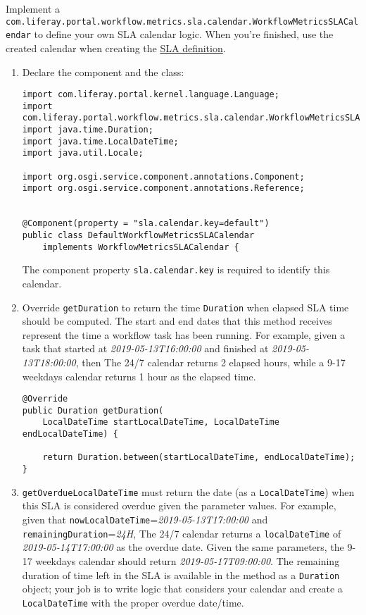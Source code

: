 Implement a
\texttt{com.liferay.portal.workflow.metrics.sla.calendar.WorkflowMetricsSLACalendar}
to define your own SLA calendar logic. When you're finished, use the
created calendar when creating the
\href{/docs/7-2/customization/-/knowledge_base/c/creating-sla-calendars}{SLA
definition}.

\begin{enumerate}
\def\labelenumi{\arabic{enumi}.}
\item
  Declare the component and the class:

\begin{verbatim}
import com.liferay.portal.kernel.language.Language;
import com.liferay.portal.workflow.metrics.sla.calendar.WorkflowMetricsSLACalendar;
import java.time.Duration;
import java.time.LocalDateTime;
import java.util.Locale;

import org.osgi.service.component.annotations.Component;
import org.osgi.service.component.annotations.Reference;


@Component(property = "sla.calendar.key=default")
public class DefaultWorkflowMetricsSLACalendar
    implements WorkflowMetricsSLACalendar {
\end{verbatim}

  The component property \texttt{sla.calendar.key} is required to
  identify this calendar.
\item
  Override \texttt{getDuration} to return the time \texttt{Duration}
  when elapsed SLA time should be computed. The start and end dates that
  this method receives represent the time a workflow task has been
  running. For example, given a task that started at
  \emph{2019-05-13T16:00:00} and finished at \emph{2019-05-13T18:00:00},
  then The 24/7 calendar returns 2 elapsed hours, while a 9-17 weekdays
  calendar returns 1 hour as the elapsed time.

\begin{verbatim}
@Override
public Duration getDuration(
    LocalDateTime startLocalDateTime, LocalDateTime endLocalDateTime) {

    return Duration.between(startLocalDateTime, endLocalDateTime);
}
\end{verbatim}
\item
  \texttt{getOverdueLocalDateTime} must return the date (as a
  \texttt{LocalDateTime}) when this SLA is considered overdue given the
  parameter values. For example, given that
  \texttt{nowLocalDateTime}=\emph{2019-05-13T17:00:00} and
  \texttt{remainingDuration}=\emph{24H}, The 24/7 calendar returns a
  \texttt{localDateTime} of \emph{2019-05-14T17:00:00} as the overdue
  date. Given the same parameters, the 9-17 weekdays calendar should
  return \emph{2019-05-17T09:00:00}. The remaining duration of time left
  in the SLA is available in the method as a \texttt{Duration} object;
  your job is to write logic that considers your calendar and create a
  \texttt{LocalDateTime} with the proper overdue date/time.


\end{enumerate}
